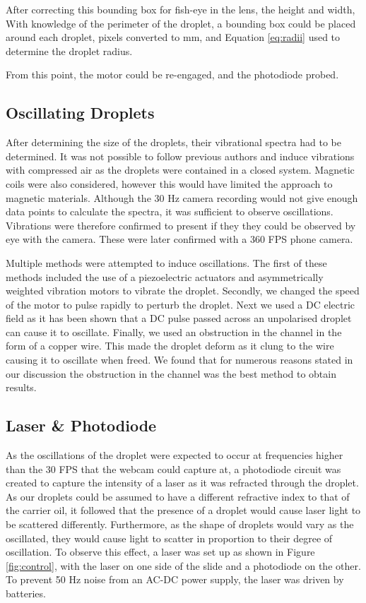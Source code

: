 \documentclass{physics_article_B}
\begin{document}
            After correcting this bounding box for fish-eye in the lens, the height and width, With knowledge of the perimeter of the droplet, a bounding box could be placed around each droplet, pixels converted to mm, and Equation \ref{eq:radii} used to determine the droplet radius.
            
            From this point, the motor could be re-engaged, and the photodiode probed.
    
    \subsection{Oscillating Droplets\label{sect:method:oscillating}}
        
        After determining the size of the droplets, their vibrational spectra had to be determined. It was not possible to follow previous authors and induce vibrations with compressed air as the droplets were contained in a closed system. Magnetic coils were also considered, however this would have limited the approach to magnetic materials. Although the 30 Hz camera recording would not give enough data points to calculate the spectra, it was sufficient to observe oscillations. Vibrations were therefore confirmed to present if they they could be observed by eye with the camera. These were later confirmed with a 360 FPS phone camera.
        
        Multiple methods were attempted to induce oscillations. The first of these methods included the use of a piezoelectric actuators and asymmetrically weighted vibration motors to vibrate the droplet. Secondly, we changed the speed of the motor to pulse rapidly to perturb the droplet. Next we used a DC electric field as it has been shown that a DC pulse passed across an unpolarised droplet can cause it to oscillate. Finally, we used an obstruction in the channel in the form of a copper wire. This made the droplet deform as it clung to the wire causing it to oscillate when freed. We found that for numerous reasons stated in our discussion the obstruction in the channel was the best method to obtain results.
        
    \subsection{Laser \& Photodiode\label{sect:method:laser}}
    
        As the oscillations of the droplet were expected to occur at frequencies higher than the 30 FPS that the webcam could capture at, a photodiode circuit was created to capture the intensity of a laser as it was refracted through the droplet. As our droplets could be assumed to have a different refractive index to that of the carrier oil\cite{viscosity1,viscosity2}, it followed that the presence of a droplet would cause laser light to be scattered differently. Furthermore, as the shape of droplets would vary as the oscillated, they would cause light to scatter in proportion to their degree of oscillation. To observe this effect, a laser was set up as shown in Figure \ref{fig:control}, with the laser on one side of the slide and a photodiode on the other. To prevent 50 Hz noise from an AC-DC power supply, the laser was driven by batteries.
        
\end{document}
